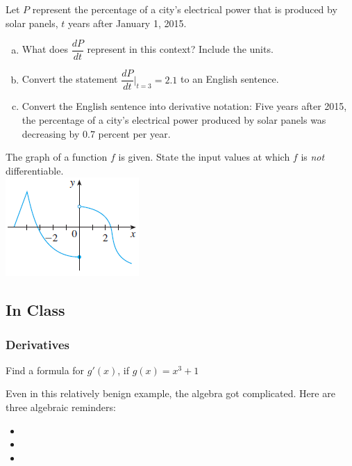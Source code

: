 \documentclass[notes]{subfiles}
\begin{document}
		\begin{ex}
			Let \(P\) represent the percentage of a city's electrical power that is produced by solar panels, \(t\) years after January 1, 2015.
			\begin{enumerate}[(a)]
				\item What does \(\dfrac{dP}{dt}\) represent in this context?  Include the units.
					
				\item Convert the statement \(\dfrac{dP}{dt}\bigg\rvert_{t = 3} = 2.1\) to an English sentence.
					
				\item Convert the English sentence into derivative notation: Five years after 2015, the percentage of a city's electrical power produced by solar panels was decreasing by 0.7 percent per year.
					
			\end{enumerate}
		\end{ex}
		
		\begin{ex}
			The graph of a function \(f\) is given.  State the input values at which \(f\) is \emph{not} differentiable.\\
			\includegraphics{3.2fig1}
		\end{ex}
			\newpage
	\subsection*{In Class}			
	\subsubsection*{Derivatives}

		\begin{ex}
			Find a formula for \(g'(x)\), if \(g(x) = x^3 + 1\)
		\end{ex}
			
		Even in this relatively benign example, the algebra got complicated.  Here are three algebraic reminders:
			\begin{itemize}
			\setlength\itemsep{25pt}
				\item 
				\item 
				\item 
			\end{itemize}
		
\end{document}
